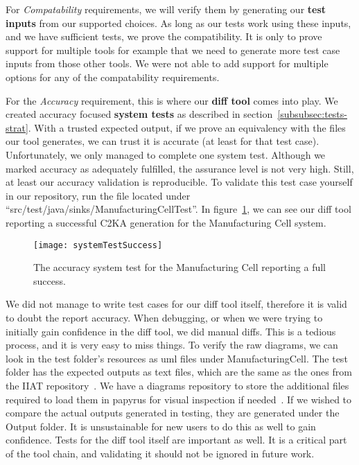 For \textit{Compatability} requirements,
we will verify them by generating our \textbf{test inputs} from our supported choices.
As long as our tests work using these inputs, and we have sufficient tests, we prove the compatibility.
It is only to prove support for multiple tools for example that we need to generate more test case inputs from those other tools.
We were not able to add support for multiple options for any of the compatability requirements.

For the \textit{Accuracy} requirement, this is where our \textbf{diff tool} comes into play.
We created accuracy focused \textbf{system tests} as described in section~\ref{subsubsec:tests-strat}.
With a trusted expected output, if we prove an equivalency with the files our tool generates, we can trust it is accurate (at least for that test case).
Unfortunately, we only managed to complete one system test.
Although we marked accuracy as adequately fulfilled, the assurance level is not very high.
Still, at least our accuracy validation is reproducible.
To validate this test case yourself in our repository, run the file located under ``src/test/java/sinks/ManufacturingCellTest''.
In figure~\ref{fig:acc-test}, we can see our diff tool reporting a successful C2KA generation for the Manufacturing Cell system.

\begin{figure}
    \centering
    \texttt{[image: systemTestSuccess]}
    \caption{The accuracy system test for the Manufacturing Cell reporting a full success.}
    \label{fig:acc-test}
\end{figure}

We did not manage to write test cases for our diff tool itself, therefore it is valid to doubt the report accuracy.
When debugging, or when we were trying to initially gain confidence in the diff tool, we did manual diffs.
This is a tedious process, and it is very easy to miss things.
To verify the raw diagrams, we can look in the test folder's resources as uml files under ManufacturingCell.
The test folder has the expected outputs as text files, which are the same as the ones from the IIAT repository~\cite{repo_iiat}.
We have a diagrams repository to store the additional files required to load them in papyrus for visual inspection if needed~\cite{repo_diagram}.
If we wished to compare the actual outputs generated in testing, they are generated under the Output folder.
It is unsustainable for new users to do this as well to gain confidence.
Tests for the diff tool itself are important as well.
It is a critical part of the tool chain, and validating it should not be ignored in future work.

